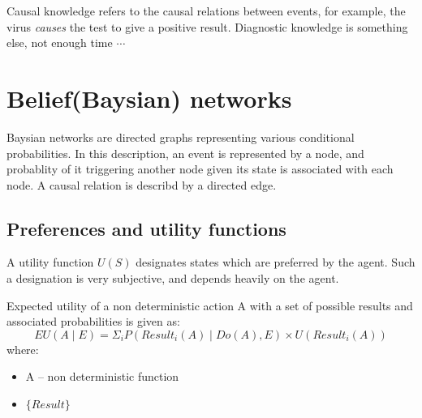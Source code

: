         {
            Causal knowledge refers to the causal relations between events, for example, the virus \textit{causes} the test to give a positive result.
            Diagnostic knowledge is something else, not enough time $\cdots $
        }


 \chapter{Belief(Baysian) networks}
 
    Baysian networks are directed graphs representing various conditional probabilities. In this description, an event is represented by a node, and probablity of it triggering another node given its state is associated with each node. A causal relation is describd by a directed edge.
    \begin{center}
\end{center}
\section{Preferences and utility functions}

{
    A utility function $U(S)$ designates states which are preferred by the agent. Such a designation is very subjective, and depends heavily on the agent.}
    {
        Expected utility of a non deterministic action A with a set of possible results and associated probabilities is given as:
        \begin{equation}
            EU(A \mid E) = \Sigma_i P(Result_i(A)\mid Do(A),E) \times U(Result_i(A))
        \end{equation}
        where:
        \begin{itemize}
                \item A  -- non deterministic function
                \item $\{Result\}$
                
        \end{itemize}
    }


